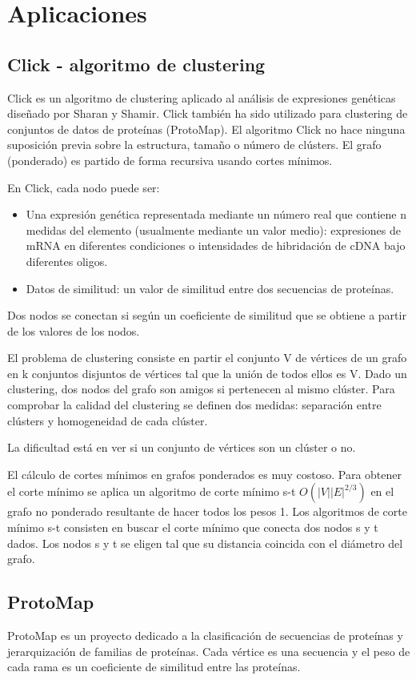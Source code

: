 \section{Aplicaciones}
\subsection{Click - algoritmo de clustering}
Click es un algoritmo de clustering aplicado al análisis de expresiones genéticas diseñado por Sharan y Shamir. Click también ha sido utilizado para clustering de conjuntos de datos de proteínas (ProtoMap). El algoritmo Click no hace ninguna suposición previa sobre la estructura, tamaño o número de clústers. El grafo (ponderado) es partido de forma recursiva usando cortes mínimos.

En Click, cada nodo puede ser:
\begin{itemize}
\item Una expresión genética representada mediante un número real que contiene n medidas del elemento (usualmente mediante un valor medio): expresiones de mRNA en diferentes condiciones o intensidades de hibridación de cDNA bajo diferentes oligos.
\item Datos de similitud: un valor de similitud entre dos secuencias de proteínas.
\end{itemize}
Dos nodos se conectan si según un coeficiente de similitud que se obtiene a partir de los valores de los nodos.

El problema de clustering consiste en partir el conjunto V de vértices de un grafo en k conjuntos disjuntos de vértices tal que la unión de todos ellos es V. Dado un clustering, dos nodos del grafo son amigos si pertenecen al mismo clúster. Para comprobar la calidad del clustering se definen dos medidas: separación entre clústers y homogeneidad de cada clúster.

La dificultad está en ver si un conjunto de vértices son un clúster o no.

El cálculo de cortes mínimos en grafos ponderados es muy costoso. Para obtener el corte mínimo se aplica un algoritmo de corte mínimo s-t $O(|V||E|^{2/3})$ en el grafo no ponderado resultante de
hacer todos los pesos 1. Los algoritmos de corte mínimo s-t consisten en buscar el corte mínimo que conecta dos nodos s y t dados. Los nodos s y t se eligen tal que su distancia coincida con el diámetro del grafo.

\subsection{ProtoMap}
ProtoMap es un proyecto dedicado a la clasificación de secuencias de proteínas y jerarquización de familias de proteínas. Cada vértice es una secuencia y el peso de cada rama es un coeficiente de similitud entre las proteínas.


